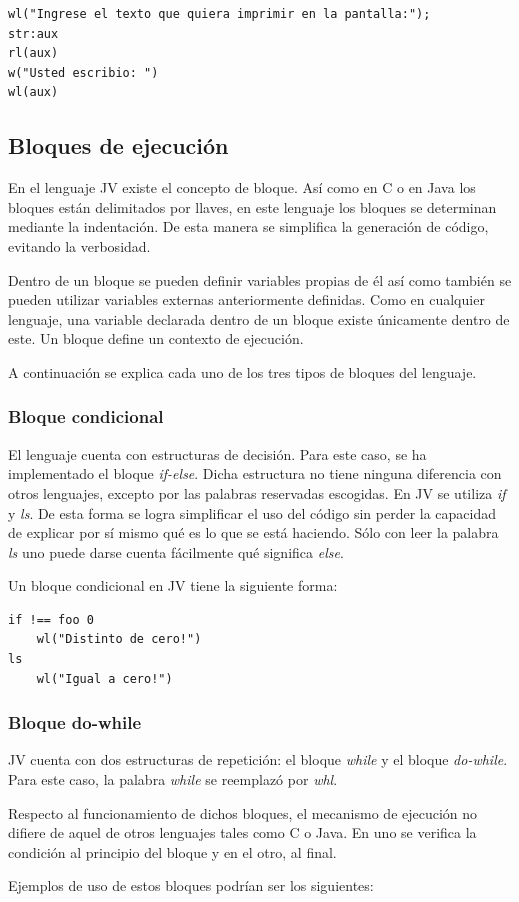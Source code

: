 \documentclass{article}
\begin{document}
            \begin{lstlisting}
wl("Ingrese el texto que quiera imprimir en la pantalla:");
str:aux
rl(aux)
w("Usted escribio: ")
wl(aux)
            \end{lstlisting}

        \subsection{Bloques de ejecución}
            \par En el lenguaje JV existe el concepto de bloque. Así como en C o en Java los bloques están delimitados por llaves, en este lenguaje los bloques se determinan mediante la indentación. De esta manera se simplifica la generación de código, evitando la verbosidad.
            \par Dentro de un bloque se pueden definir variables propias de él así como también se pueden utilizar variables externas anteriormente definidas. Como en cualquier lenguaje, una variable declarada dentro de un bloque existe únicamente dentro de este. Un bloque define un contexto de ejecución.
            \par A continuación se explica cada uno de los tres tipos de bloques del lenguaje.

            \subsubsection{Bloque condicional}
                \par El lenguaje cuenta con estructuras de decisión. Para este caso, se ha implementado el bloque \textit{if-else}. Dicha estructura no tiene ninguna diferencia con otros lenguajes, excepto por las palabras reservadas escogidas. En JV se utiliza \textit{if} y \textit{ls}. De esta forma se logra simplificar el uso del código sin perder la capacidad de explicar por sí mismo qué es lo que se está haciendo. Sólo con leer la palabra \textit{ls} uno puede darse cuenta fácilmente qué significa \textit{else}.
                \par Un bloque condicional en JV tiene la siguiente forma:
                \begin{lstlisting}
if !== foo 0
    wl("Distinto de cero!")
ls
    wl("Igual a cero!")
                \end{lstlisting}      

            \subsubsection{Bloque do-while}
                \par JV cuenta con dos estructuras de repetición: el bloque \textit{while} y el bloque \textit{do-while}. Para este caso, la palabra \textit{while} se reemplazó por \textit{whl}.
                \par Respecto al funcionamiento de dichos bloques, el mecanismo de ejecución no difiere de aquel de otros lenguajes tales como C o Java. En uno se verifica la condición al principio del bloque y en el otro, al final.
                \par Ejemplos de uso de estos bloques podrían ser los siguientes:
\end{document}
